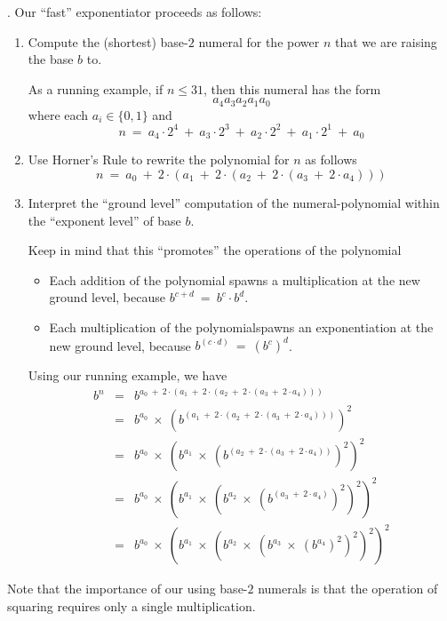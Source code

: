 \bigskip

.
Our ``fast'' exponentiator proceeds as follows:
\begin{enumerate}
\item
Compute the (shortest) base-$2$ numeral for the power $n$ that we
are raising the base $b$ to.

As a running example, if $n \leq 31$, then this numeral has the form
\[ a_4 a_3 a_2 a_1 a_0 \]
where each $a_i \in \{0,1\}$ and
\[ n \ = \
a_4 \cdot 2^4 \ + \  a_3 \cdot 2^3 \ + \  a_2 \cdot 2^2 \ + \  a_1
\cdot 2^1 \ + \ a_0
\] 

\item
Use Horner's Rule to rewrite the polynomial for $n$ as follows
\[ n \ = \
a_0 \ + \ 2 \cdot (a_1 \ + \ 2 \cdot (a_2 \ + \ 2 \cdot (a_3 \ + \
2 \cdot a_4 ))) \]

\item
Interpret the ``ground level'' computation of the numeral-polynomial
within the ``exponent level'' of base $b$.

Keep in mind that this ``promotes'' the operations of the polynomial
\begin{itemize}
\item
Each addition of the polynomial spawns a multiplication at the new
ground level, because $b^{c + d} \ = \ b^c \cdot b^d$.
\item
Each multiplication of the polynomialspawns an exponentiation at the
new ground level, because $b^{(c \cdot d)} \ = \ (b^c)^d$.
\end{itemize}

Using our running example, we have
\begin{eqnarray*}
b^n & = &
 b^{a_0 \ + \ 2 \cdot (a_1 \ + \ 2 \cdot (a_2 \ + \ 2 \cdot (a_3 \ + \
          2 \cdot a_4 )))} \\
    & = &
 b^{a_0} \ \times \ 
\left( b^{
(a_1 \ + \ 2 \cdot (a_2 \ + \ 2 \cdot (a_3 \ + \ 2 \cdot a_4 )))}
\right)^2 \\
    & = &
 b^{a_0} \ \times \
\left(
b^{a_1}  \ \times \
\left(
b^{(a_2 \ + \ 2 \cdot (a_3 \ + \ 2 \cdot a_4 ))}
\right)^2
\right)^2 \\
    & = &
b^{a_0} \ \times \
\left(
b^{a_1}  \ \times \
\left(
b^{a_2}  \ \times \
\left(
b^{(a_3 \ + \ 2 \cdot a_4 )}
\right)^2
\right)^2
\right)^2 \\
    & = &
b^{a_0} \ \times \
\left(
b^{a_1}  \ \times \
\left(
b^{a_2}  \ \times \
\left(
b^{a_3}  \ \times \
\left(
b^{a_4}
\right)^2
\right)^2
\right)^2
\right)^2
\end{eqnarray*}
\end{enumerate}
Note that the importance of our using base-$2$ numerals is that the
operation of squaring requires only a single multiplication.

